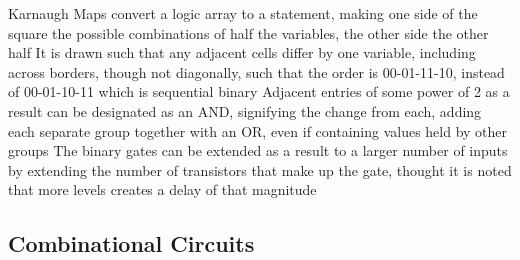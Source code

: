 \documentclass[11 pt, twoside]{article}
\newenvironment{outline*}
{
	\begin{outline}[enumerate]
	}
	{\end{outline}
}
\begin{document}
\begin{outline*}
\2 Karnaugh Maps convert a logic array to a statement, making one side of the square the possible combinations of half the variables, the other side the other half
\3 It is drawn such that any adjacent cells differ by one variable, including across borders, though not diagonally, such that the order is 00-01-11-10, instead of 00-01-10-11 which is sequential binary
\3 Adjacent entries of some power of 2 as a result can be designated as an AND, signifying the change from each, adding each separate group together with an OR, even if containing values held by other groups
\2 The binary gates can be extended as a result to a larger number of inputs by extending the number of transistors that make up the gate, thought it is noted that more levels creates a delay of that magnitude
\end{outline*}
\subsection{Combinational Circuits}
\end{document}
